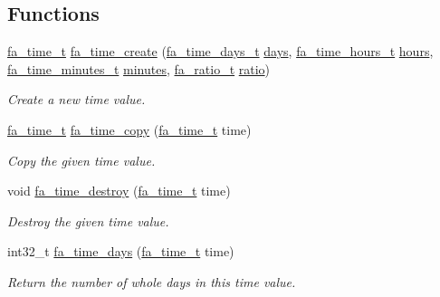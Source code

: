 \subsection*{Functions}
\begin{DoxyCompactItemize}
\item 
\hyperlink{group___fa_time_ga227cc693f20b4873fed11028bcade184}{fa\-\_\-time\-\_\-t} \hyperlink{group___fa_time_ga4423ba1b33d4035a6b4a1f084aa31ff2}{fa\-\_\-time\-\_\-create} (\hyperlink{group___fa_time_ga126d90b34014d28bf3f4930b5e370598}{fa\-\_\-time\-\_\-days\-\_\-t} \hyperlink{util_8h_a300f263b1eae073cc0df9c2450f9b3de}{days}, \hyperlink{group___fa_time_gabb41271106b33206f546a0cb3b56a33e}{fa\-\_\-time\-\_\-hours\-\_\-t} \hyperlink{util_8h_a2538097ff7138a83801cced657c8cfbf}{hours}, \hyperlink{group___fa_time_ga1103d61f9fdf2839e8cc15ee5fac7b4e}{fa\-\_\-time\-\_\-minutes\-\_\-t} \hyperlink{util_8h_a237a482b0d534168d425b103ab35cf61}{minutes}, \hyperlink{group___fa_ratio_gaf3b37b5fdfcccb6283b7ac806c72b273}{fa\-\_\-ratio\-\_\-t} \hyperlink{util_8h_a866d3cbbee2679ec3c34f27a256445de}{ratio})
\begin{DoxyCompactList}\small\item\em Create a new time value. \end{DoxyCompactList}\item 
\hyperlink{group___fa_time_ga227cc693f20b4873fed11028bcade184}{fa\-\_\-time\-\_\-t} \hyperlink{group___fa_time_gabc8112d7c4c3305ceef399752d261b75}{fa\-\_\-time\-\_\-copy} (\hyperlink{group___fa_time_ga227cc693f20b4873fed11028bcade184}{fa\-\_\-time\-\_\-t} time)
\begin{DoxyCompactList}\small\item\em Copy the given time value. \end{DoxyCompactList}\item 
void \hyperlink{group___fa_time_gac91ac3ee6483082b7759f0c5850c9f8a}{fa\-\_\-time\-\_\-destroy} (\hyperlink{group___fa_time_ga227cc693f20b4873fed11028bcade184}{fa\-\_\-time\-\_\-t} time)
\begin{DoxyCompactList}\small\item\em Destroy the given time value. \end{DoxyCompactList}\item 
int32\-\_\-t \hyperlink{group___fa_time_gacb41e735f51932696ee64d464107fb4d}{fa\-\_\-time\-\_\-days} (\hyperlink{group___fa_time_ga227cc693f20b4873fed11028bcade184}{fa\-\_\-time\-\_\-t} time)
\begin{DoxyCompactList}\small\item\em Return the number of whole days in this time value. \end{DoxyCompactList}\item 

\end{DoxyCompactItemize}
